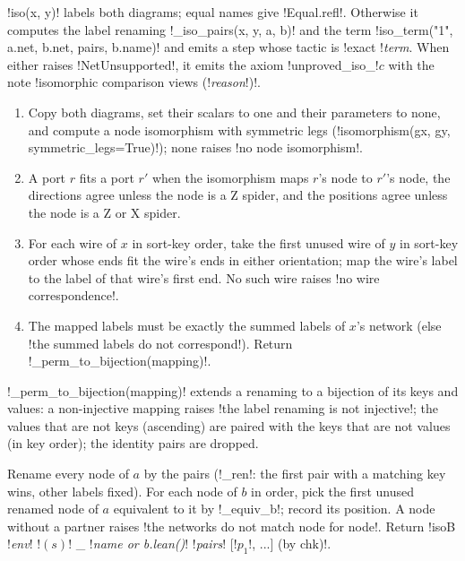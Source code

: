 {\py!iso(x, y)! labels both diagrams; equal names give \lean!Equal.refl!. Otherwise it computes
the label renaming \py!_iso_pairs(x, y, a, b)! and the term \py!iso_term("1", a.net, b.net, pairs, b.name)!
and emits a step whose tactic is \code!exact !\textit{term}. When either raises
\py!NetUnsupported!, it emits the axiom \code!unproved_iso_!$c$ with the note
\code!isomorphic comparison views (!\textit{reason}\code!)!.

\begin{algorithm}\label{alg:lean-export-net-iso-pairs}
\begin{enumerate}
\item Copy both diagrams, set their scalars to one and their parameters to none, and compute a
  node isomorphism with symmetric legs (\py!isomorphism(gx, gy, symmetric_legs=True)!); none raises
  \code!no node isomorphism!.
\item A port $r$ fits a port $r'$ when the isomorphism maps $r$'s node to $r'$'s node, the
  directions agree unless the node is a Z spider, and the positions agree unless the node is a Z
  or X spider.
\item For each wire of $x$ in sort-key order, take the first unused wire of $y$ in sort-key order
  whose ends fit the wire's ends in either orientation; map the wire's label to the label of that
  wire's first end. No such wire raises \code!no wire correspondence!.
\item The mapped labels must be exactly the summed labels of $x$'s network (else
  \code!the summed labels do not correspond!). Return \py!_perm_to_bijection(mapping)!.
\end{enumerate}
\end{algorithm}

\py!_perm_to_bijection(mapping)! extends a renaming to a bijection of its keys and values: a
non-injective mapping raises \code!the label renaming is not injective!; the values that are not
keys (ascending) are paired with the keys that are not values (in key order); the identity pairs
are dropped.

\begin{algorithm}[\py!iso_term(s, a, b, pairs, name=None)!]\label{alg:lean-export-net-iso-term}
Rename every node of $a$ by the pairs (\py!_ren!: the first pair with a matching key wins, other
labels fixed). For each node of $b$ in order, pick the first unused renamed node of $a$
equivalent to it by \py!_equiv_b!; record its position. A node without a partner raises
\code!the networks do not match node for node!. Return
\code!isoB !\textit{env}\code! !$(s)$\code! _ !\textit{name or b.lean()}\code! !\textit{pairs}\code! [!$p_1$\code!, ...] (by chk)!.
\end{algorithm}

}
